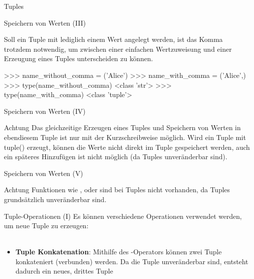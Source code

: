 \begin{subsection}{Tuples}
        \begin{frame}[fragile]{Speichern von Werten (III)}
            
            Soll ein Tuple mit lediglich einem Wert angelegt werden, ist das Komma trotzdem notwendig, um zwischen einer einfachen Wertzuweisung und einer Erzeugung eines Tuples unterscheiden zu können.
    
\begin{pyconcode}
>>> name_without_comma = ('Alice')
>>> name_with_comma = ('Alice',)
>>> type(name_without_comma)
<class 'str'>
>>> type(name_with_comma)
<class 'tuple'>
\end{pyconcode}  
        \end{frame}
        
        \begin{frame}[fragile]{Speichern von Werten (IV)}
         
            \begin{alertblock}{Achtung}
                Das gleichzeitige Erzeugen eines Tuples und Speichern von Werten in ebendiesem Tuple ist nur mit der Kurzschreibweise möglich. Wird ein Tuple mit tuple() erzeugt, können die Werte nicht direkt im Tuple gespeichert werden, auch ein späteres Hinzufügen ist nicht möglich (da Tuples unveränderbar sind).
            \end{alertblock}
        \end{frame}
        
        
        \begin{frame}[fragile]{Speichern von Werten (V)}
            \begin{alertblock}{Achtung}
               Funktionen wie ,  oder  sind bei Tuples nicht vorhanden, da Tuples grundsätzlich unveränderbar sind.
            \end{alertblock}
        \end{frame}
      
        \begin{frame}[fragile]{Tuple-Operationen (I)}
           Es können verschiedene Operationen verwendet werden, um neue Tuple zu erzeugen: \\~\
           
           \begin{itemize}
               \item \textbf{Tuple Konkatenation}: Mithilfe des \code{+}-Operators können zwei Tuple konkateniert (verbunden) werden. Da die Tuple unveränderbar sind, entsteht dadurch ein neues, drittes Tuple


\end{itemize}
\end{frame}
\end{subsection}
